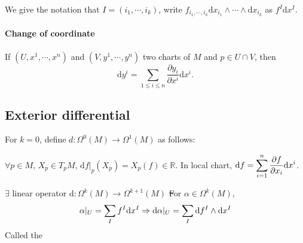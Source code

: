 We give the notation that  $ I=\left(i_1,\cdots,i_k\right) $, write  $ f_{i_1,\cdots,i_k}\mathrm{d}x_{i_1}\wedge\cdots\wedge \mathrm{d}x_{i_k} $ as  $ f^I\mathrm{d}x^I $.
\paragraph{Change of coordinate} If  $ (U,x^1,\cdots,x^n) $ and  $ (V,y^1,\cdots,y^n)$ two charts of  $ M $ and  $ p\in U\cap V $, then
\begin{equation}
    \mathrm{d}y^i=\sum_{1 \leq i \leq n}\frac{\partial y_i}{\partial x^i}\mathrm{d}x^i.
\end{equation}
\subsection{Exterior differential}
For  $ k=0 $, define  $ d:\Omega^0(M)\rightarrow \Omega^1(M) $ as follows:

$ \forall p\in M $,  $ X_p\in T_pM $,  $ \mathrm{d}f|_p(X_p)=X_p(f)\in \mathbb{R} $.
In local chart,  $ \mathrm{d}f=\displaystyle\sum_{i=1}^n\frac{\partial f}{\partial x_i}\mathrm{d}x^i $.
\begin{theorem}
    $ \exists $ linear operator  $ \mathrm{d}:\Omega^k(M)\rightarrow \Omega^{k+1}(M) $  \st
    For $ \alpha\in \Omega^k(M) $,
    \begin{equation}
        \alpha|_U=\displaystyle\sum_If^I\mathrm{d}x^I \Rightarrow \mathrm{d}\alpha|_U=\displaystyle\sum_{I}\mathrm{d}f^I\wedge\mathrm{d}x^I \label{eq:local coordinate of exterior differential}
    \end{equation}
    Called the 
\end{theorem}

